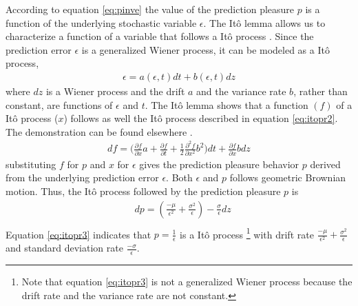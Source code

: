 \documentclass[11pt, onecolumn]{article}
\begin{document}
According to equation \ref{eq:pinve} the value of the prediction pleasure $p$ is a function of the underlying stochastic variable $\epsilon$. The It\^{o} lemma allows us to characterize a function of a variable that follows a It\^{o} process \citep{ito_stochastic_1951}. Since the prediction error $\epsilon$ is a generalized Wiener process, it can be modeled as a It\^{o} process, 
\begin{equation*}
\begin{split}
   \epsilon = a(\epsilon,t)dt + b(\epsilon,t)dz
\end{split}
\label{eq:itopr}
\end{equation*}
where $dz$ is a Wiener process and the drift $a$ and the variance rate $b$, rather than constant, are functions of $\epsilon$ and $t$. The It\^{o} lemma shows that a function $(f)$ of a It\^{o} process ($x$) follows as well the It\^{o} process described in equation \ref{eq:itopr2}. The demonstration can be found elsewhere \citep{shreve_stochastic_2010}. 
\begin{equation}
\begin{split}
   df = \bigg(\frac{\partial f}{\partial x} a  + \frac{\partial f}{\partial t} + \frac{1}{2}\frac{\partial ^2 f}{\partial x^2} b^2 \bigg)dt + \frac{\partial f}{\partial x}b dz
\end{split}
\label{eq:itopr2}
\end{equation}
substituting $f$ for $p$ and $x$ for $\epsilon$ gives the prediction pleasure behavior $p$ derived from the underlying prediction error $\epsilon$. Both $\epsilon$ and $p$ follows geometric Brownian motion.
Thus, the It\^{o} process followed by the prediction pleasure $p$ is 
\begin{equation*}
\begin{split}
 & dp =  (\frac{-\mu}{\epsilon^2} + \frac{\sigma^2}{\epsilon}) - \frac{\sigma}{\epsilon}dz \\
\end{split}
\label{eq:itopr3}
\end{equation*}
Equation \ref{eq:itopr3} indicates that $p = \frac{1}{\epsilon}$ is a It\^{o} process \footnote{Note that equation \ref{eq:itopr3} is not a generalized Wiener process because the drift rate and the variance rate are not constant.} with drift rate $\frac{-\mu}{\epsilon^2} + \frac{\sigma^2}{\epsilon}$ and standard deviation rate $\frac{-\sigma}{\epsilon}$.
\end{document}
